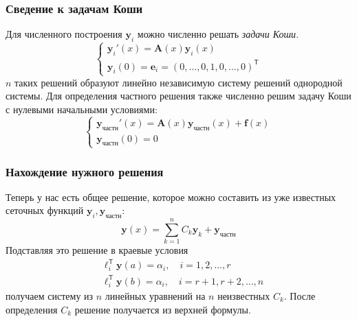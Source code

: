 \documentclass[professionalfonts,compress,unicode,aspectratio=169]{beamer}
\begin{document}
\begin{frame}\frametitle{Сведение к задачам Коши}
	Для численного построения $\mathbf{y}_i$ можно численно решать \emph{задачи Коши}.
	\[
	\begin{cases}
	\mathbf{y}_i'(x) = \mathbf{A}(x) \mathbf{y}_i(x)\\
	\mathbf{y}_i(0) = \mathbf{e}_i = (0, \dots, 0, 1, 0, \dots, 0)^\mathsf{T}
	\end{cases}
	\]
	$n$ таких решений образуют линейно независимую систему решений однородной
	системы. Для определения частного решения также численно решим задачу Коши с нулевыми
	начальными условиями:
	\[
	\begin{cases}
	\mathbf{y}_\text{частн}'(x) = \mathbf{A}(x) \mathbf{y}_\text{частн}(x) +
	\mathbf{f}(x)\\
	\mathbf{y}_\text{частн}(0) = 0
	\end{cases}
	\]
\end{frame}

\begin{frame}\frametitle{Нахождение нужного решения}
	Теперь у нас есть общее решение, которое можно составить из уже известных
	сеточных функций $\mathbf{y}_i, \mathbf{y}_\text{частн}$:
	\[
	\mathbf{y}(x) = \sum_{k = 1}^n C_k \mathbf{y}_k + \mathbf{y}_\text{частн}
	\]
	Подставляя это решение в краевые условия
	\begin{align*}
	&\boldsymbol{\ell}_i^\mathsf{T} \mathbf{y}(a) = \alpha_i, \quad i = 1, 2, \dots, r\\
	&\boldsymbol{\ell}_i^\mathsf{T} \mathbf{y}(b) = \alpha_i, \quad i = r+1, r+2, \dots, n
	\end{align*}
	получаем систему из $n$ линейных уравнений на $n$ неизвестных $C_k$. После
	определения $C_k$ решение получается из верхней формулы.
\end{frame}
\end{document}
